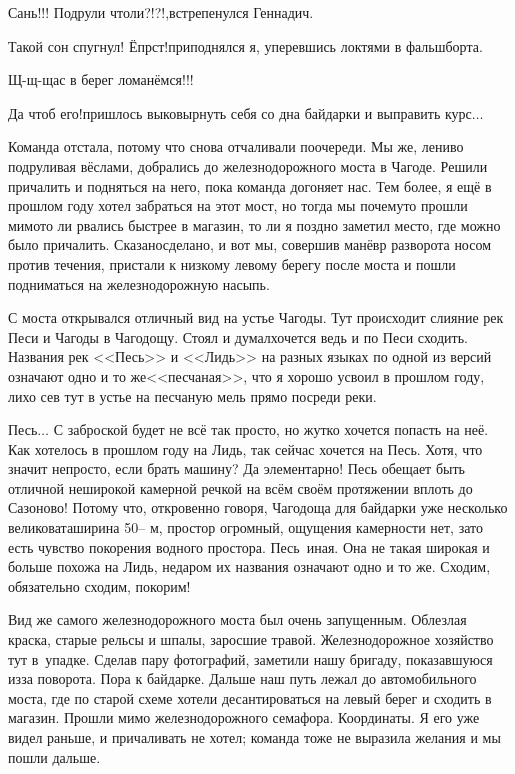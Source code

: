 \diagdash Сань!!! Подрули чтоли?!?!,\mdash встрепенулся Геннадич.

\diagdash Такой сон спугнул! Ёпрст!\mdash приподнялся я, уперевшись локтями в фальшборта.

\diagdash Щ-щ-щас в берег ломанёмся!!!

\diagdash Да чтоб его!\mdash пришлось выковырнуть себя со дна байдарки и выправить курс$\ldots$

Команда отстала, потому что снова отчаливали по\sdash очереди. Мы же, лениво подруливая вёслами, добрались до железнодорожного моста в Чагоде. Решили причалить и подняться на него, пока команда догоняет нас. Тем более, я ещё в прошлом году хотел забраться на этот мост, но тогда мы почему\sdash то прошли мимо\mdash то ли рвались быстрее в магазин, то ли я поздно заметил место, где можно было причалить. Сказано\mdash сделано, и вот мы, совершив манёвр разворота носом против течения, пристали к низкому левому берегу после моста и пошли подниматься на железнодорожную насыпь.

С моста открывался отличный вид на устье Чагоды. Тут происходит слияние рек Песи и Чагоды в Чагодощу. Стоял и думал\mdash хочется ведь и по Песи сходить. Названия рек <<Песь>> и <<Лидь>> на разных языках по одной из версий означают одно и то же\mdash <<песчаная>>\cite{ЧагодаАльманахКузнецов}, что я хорошо усвоил в прошлом году, лихо сев тут в устье на песчаную мель прямо посреди реки. 

Песь$\ldots$ С заброской будет не всё так просто, но жутко хочется попасть на неё. Как хотелось в прошлом году на Лидь, так сейчас хочется на Песь. Хотя, что значит непросто, если брать машину? Да элементарно! 
Песь обещает быть отличной неширокой камерной речкой на всём своём протяжении вплоть до Сазоново! Потому что, откровенно говоря, Чагодоща для байдарки уже несколько великовата\mdash ширина 50\thinspace\nobreakdash-- м, простор огромный, ощущения камерности нет, зато есть чувство покорения водного простора. Песь~иная. Она не такая широкая и больше похожа на Лидь, недаром их названия означают одно и то же. Сходим, обязательно сходим, покорим!

Вид же самого железнодорожного моста был очень запущенным. Облезлая краска, старые рельсы и шпалы, заросшие травой. Железнодорожное хозяйство тут в~упадке. Сделав пару фотографий, заметили нашу бригаду, показавшуюся из\sdash за поворота. Пора к байдарке. Дальше наш путь лежал до автомобильного моста, где по старой схеме хотели десантироваться на левый берег и сходить в магазин. Прошли мимо железнодорожного семафора. Координаты\mdash \CoordsChagodoschaSemaphor. Я его уже видел раньше, и причаливать не хотел; команда тоже не выразила желания и мы пошли дальше. 

